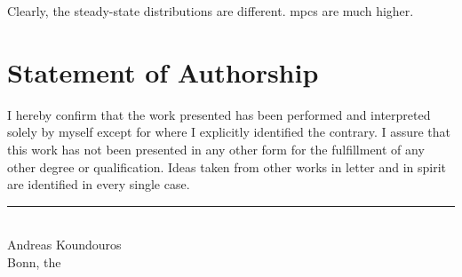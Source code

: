 \documentclass[12pt]{article} %
\numberwithin{equation}{section} %
\numberwithin{figure}{section}
\numberwithin{table}{section}
\begin{document}
\begin{refsection}
\begin{appendices}
Clearly, the steady-state distributions are different. \Gls{mpc}s are much higher.



\end{appendices}
\newpage
\thispagestyle{plain}
\renewcommand*{\thepage}{A-\Roman{page}} %
\thispagestyle{plain}
\printbibliography[heading=subbibliography, title={Appendix References}]
\end{refsection}

\newpage
\thispagestyle{plain}
\section*{Statement of Authorship} %
I hereby confirm that the work presented has been performed and interpreted solely by myself except for where I explicitly identified the contrary. I assure that this work has not been presented in any other form for the fulfillment of any other degree or qualification. Ideas taken from other works in letter and in spirit are identified in every single case.

\vspace{2cm}
\noindent
\rule{8cm}{0.4pt}\\
Andreas Koundouros\\
Bonn, the 
\end{document}
